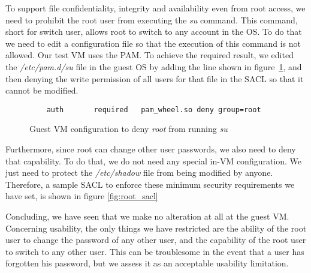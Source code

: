 \par To support file confidentiality, integrity and availability even from root access, we need to prohibit the root user from executing the \textit{su} command. This command, short for switch user, allows root to switch to any account in the \ac{OS}. To do that we need to edit a configuration file so that the execution of this command is not allowed. Our test \ac{VM} uses the \ac{PAM}. To achieve the required result, we edited the \textit{/etc/pam.d/su} file in the guest \ac{OS} by adding the line shown in figure~\ref{fig:pam}, and then denying the write permission of all users for that file in the \ac{SACL} so that it cannot be modified.

\begin{figure}[ht]
	\centering
	\begin{lstlisting}
	auth       required   pam_wheel.so deny group=root	
	\end{lstlisting}
	\caption{Guest \ac{VM} configuration to deny \emph{root} from running \emph{su}}
	\label{fig:pam}
\end{figure}

\par Furthermore, since root can change other user passwords, we also need to deny that capability. To do that, we do not need any special in-\ac{VM} configuration. We just need to protect the \textit{/etc/shadow} file from being modified by anyone. Therefore, a sample \ac{SACL} to enforce these minimum security requirements we have set, is shown in figure \ref{fig:root_sacl}


\par Concluding, we have seen that we make no alteration at all at the guest \ac{VM}. Concerning usability, the only things we have restricted are the ability of the root user to change the password of any other user, and the capability of the root user to switch to any other user. This can be troublesome in the event that a user has forgotten his password, but we assess it as an acceptable usability limitation.











